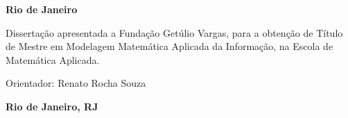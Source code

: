 \pagestyle{empty}

\begin{titlepage}


\begin{center}
{\LARGE \nomedoaluno}
\par
\vspace{200pt}
{\Huge \titulo}
\par
\vfill
\textbf{{\large Rio de Janeiro}\\
{\large \the\year}}
\end{center}
\end{titlepage}

\cleardoublepage

\pagestyle{fancy}



\thispagestyle{empty}

\begin{center}
{\LARGE \nomedoaluno}
\par
\vspace{200pt}
{\Huge \titulo}
\end{center}
\par
\vspace{90pt}
\hspace*{175pt}\parbox{7.6cm}{{\large Dissertação apresentada a Fundação Getúlio Vargas, para a obtenção de Título de Mestre em Modelagem Matemática Aplicada da Informação, na Escola de Matemática Aplicada.}}

\par
\vspace{1em}
\hspace*{175pt}\parbox{7.6cm}{{\large Orientador: Renato Rocha Souza}}

\par
\vfill
\begin{center}
\textbf{{\large Rio de Janeiro, RJ}\\
{\large \the\year}}
\end{center}

